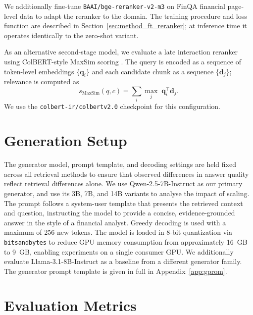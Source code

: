 \documentclass[12pt,twoside,maitrise]{dms}
\theoremstyle{definition}
\numberwithin{equation}{section}
\numberwithin{table}{chapter}
\numberwithin{figure}{chapter}
\begin{document}
We additionally fine-tune \texttt{BAAI/bge-reranker-v2-m3} on FinQA financial
page-level data to adapt the reranker to the domain. The training procedure and loss
function are described in Section~\ref{sec:method_ft_reranker}; at inference time it
operates identically to the zero-shot variant.

As an alternative second-stage model, we evaluate a late interaction reranker using
ColBERT-style MaxSim scoring \citep{khattab2020colbert}. The query is encoded as a
sequence of token-level embeddings $\{\mathbf{q}_i\}$ and each candidate chunk as a
sequence $\{\mathbf{d}_j\}$; relevance is computed as
\begin{equation}
  s_{\text{MaxSim}}(q, c) = \sum_{i} \max_{j}\; \mathbf{q}_i^\top \mathbf{d}_j.
\end{equation}
We use the \texttt{colbert-ir/colbertv2.0} checkpoint for this configuration.

\section{Generation Setup}
\label{sec:generation_setup}

The generator model, prompt template, and decoding settings are held fixed across all
retrieval methods to ensure that observed differences in answer quality reflect
retrieval differences alone. We use Qwen-2.5-7B-Instruct \citep{qwen2025qwen25} as our
primary generator, and use its 3B, 7B, and 14B variants to analyse the impact of
scaling. The prompt follows a system-user template that presents the retrieved context
and question, instructing the model to provide a concise, evidence-grounded answer in
the style of a financial analyst. Greedy decoding is used with a maximum of 256 new
tokens. The model is loaded in 8-bit quantization via \texttt{bitsandbytes} to reduce
GPU memory consumption from approximately 16~GB to 9~GB, enabling experiments on a
single consumer GPU. We additionally evaluate Llama-3.1-8B-Instruct \citep{meta2024llama} as a baseline from
a different generator family. The generator prompt template is given in full in Appendix~\ref{app:gprom}. 

\section{Evaluation Metrics}
\label{sec:metrics}
\end{document}
